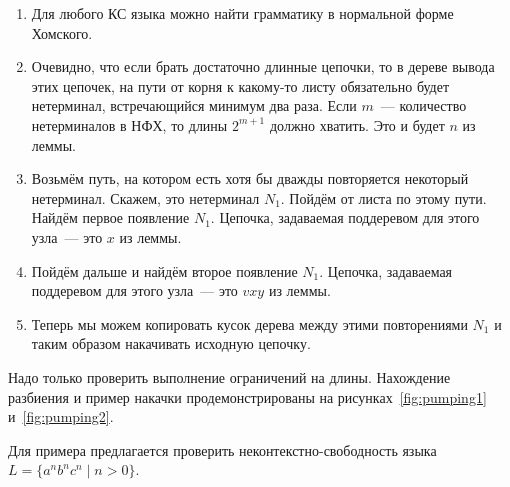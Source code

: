 \begin{proofSketch}

    \begin{enumerate}
        \item Для любого КС языка можно найти грамматику в нормальной форме Хомского.
        \item Очевидно, что если брать достаточно длинные цепочки, то в дереве вывода этих цепочек, на пути от корня к какому-то листу обязательно будет нетерминал, встречающийся минимум два раза. Если $m$~--- количество нетерминалов в НФХ, то длины $2^{m+1}$ должно хватить. Это и будет $n$ из леммы.
        \item Возьмём путь, на котором есть хотя бы дважды повторяется некоторый нетерминал. Скажем, это нетерминал  $N_1$. Пойдём от листа по этому пути. Найдём первое появление $N_1$. Цепочка, задаваемая поддеревом для этого узла~--- это $x$ из леммы.
        \item Пойдём дальше и найдём второе появление $N_1$. Цепочка, задаваемая поддеревом для этого узла~--- это $vxy$ из леммы.
        \item Теперь мы можем копировать кусок дерева между этими повторениями $N_1$ и таким образом накачивать исходную цепочку.
    \end{enumerate}
    Надо только проверить выполнение ограничений на длины.
    Нахождение разбиения и пример накачки продемонстрированы на рисунках~\ref{fig:pumping1} и~\ref{fig:pumping2}.
\end{proofSketch}


Для примера предлагается проверить неконтекстно-свободность языка $L=\{a^nb^nc^n \mid n>0\}$.
